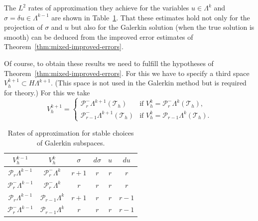 {The $L^2$ rates of approximation they achieve for the variables $u\in\Lambda^k$ and $\sigma=\delta u\in\Lambda^{k-1}$ are shown in Table~\ref{tab:galerkin-form-approximation-rates}. That these estimates hold not only for the projection of $\sigma$ and $u$ but also for the Galerkin solution (when the true solution is smooth) can be deduced from the improved error estimates of Theorem~\ref{thm:mixed-improved-errors}.}

{Of course, to obtain these results we need to fulfill the hypotheses of Theorem~\ref{thm:mixed-improved-errors}. For this we have to specify a third space $V_h^{k+1}\subset H\Lambda^{k+1}$. (This space is not used in the Galerkin method but is required for theory.) For this we take}
\[
V_h^{k+1}=\begin{cases}\mathcal P_r^-\Lambda^{k+1}(\mathcal T_h)&\text{if }V_h^k=\mathcal P_r^-\Lambda^k(\mathcal T_h),\\\mathcal P_{r-1}^-\Lambda^{k+1}(\mathcal T_h)&\text{if }V_h^k=\mathcal P_{r-1}\Lambda^k(\mathcal T_h).
\end{cases}
\]

\begin{table}[htbp]\centering
\caption{{Rates of approximation for stable choices of Galerkin subspaces.}}\label{tab:galerkin-form-approximation-rates}
\begin{tabular}{cc|cccc}\hline
$V_h^{k-1}$&$V_h^k$&$\sigma$&$d\sigma$&$u$&$du$\\\hline
$\mathcal P_r\Lambda^{k-1}$&$\mathcal P_r^-\Lambda^k$&$r+1$&$r$&$r$&$r$\\
$\mathcal P_r^-\Lambda^{k-1}$&$\mathcal P_r^-\Lambda^k$&$r$&$r$&$r$&$r$\\
$\mathcal P_r\Lambda^{k-1}$&$\mathcal P_{r-1}\Lambda^k$&$r+1$&$r$&$r$&$r-1$\\
$\mathcal P_r^-\Lambda^{k-1}$&$\mathcal P_{r-1}\Lambda^k$&$r$&$r$&$r$&$r-1$\\\hline
\end{tabular}
\end{table}

